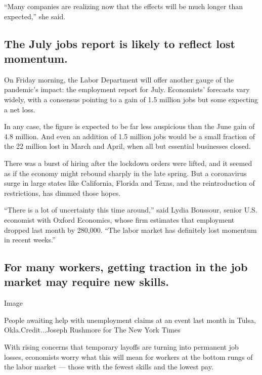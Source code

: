 ``Many companies are realizing now that the effects will be much longer
than expected,'' she said.

\hypertarget{the-july-jobs-report-is-likely-to-reflect-lost-momentum}{%
\subsection{The July jobs report is likely to reflect lost
momentum.}\label{the-july-jobs-report-is-likely-to-reflect-lost-momentum}}

On Friday morning, the Labor Department will offer another gauge of the
pandemic's impact: the employment report for July. Economists' forecasts
vary widely, with a consensus pointing to a gain of 1.5 million jobs but
some expecting a net loss.

In any case, the figure is expected to be far less auspicious than the
June gain of 4.8 million. And even an addition of 1.5 million jobs would
be a small fraction of the 22 million lost in March and April, when all
but essential businesses closed.

There was a burst of hiring after the lockdown orders were lifted, and
it seemed as if the economy might rebound sharply in the late spring.
But a coronavirus surge in large states like California, Florida and
Texas, and the reintroduction of restrictions, has dimmed those hopes.

``There is a lot of uncertainty this time around,'' said Lydia Boussour,
senior U.S. economist with Oxford Economics, whose firm estimates that
employment dropped last month by 280,000. ``The labor market has
definitely lost momentum in recent weeks.''

\hypertarget{for-many-workers-getting-traction-in-the-job-market-may-require-new-skills}{%
\subsection{For many workers, getting traction in the job market may
require new
skills.}\label{for-many-workers-getting-traction-in-the-job-market-may-require-new-skills}}

Image

People awaiting help with unemployment claims at an event last month in
Tulsa, Okla.Credit...Joseph Rushmore for The New York Times

With rising concerns that temporary layoffs are turning into permanent
job losses, economists worry what this will mean for workers at the
bottom rungs of the labor market --- those with the fewest skills and
the lowest pay.

